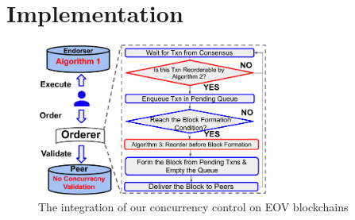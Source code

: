 \section{Implementation}
\label{sec:txn:impl}

\begin{figure}
  \center
	\includegraphics[width=0.68\textwidth]{diagram/txn/fabricX_arch.pdf}
  \caption{The integration of our concurrency control on EOV blockchains}
	\label{diagram:txn:impl:fabricx}
\end{figure}

